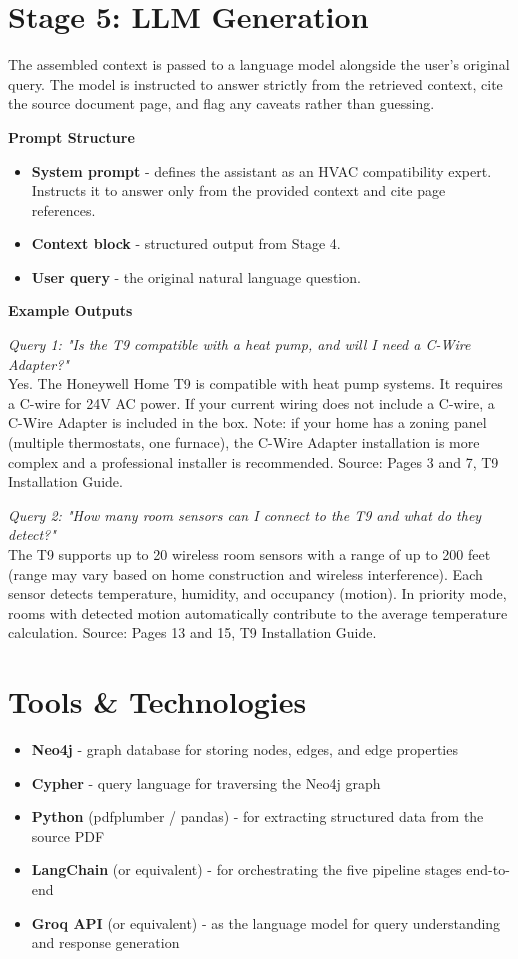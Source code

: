\documentclass[11pt,a4paper]{article}
\begin{document}
\section{Stage 5: LLM Generation}
The assembled context is passed to a language model alongside the user's original query. The model is instructed to answer strictly from the retrieved context, cite the source document page, and flag any caveats rather than guessing.

\textbf{Prompt Structure}
\begin{itemize}
    \item \textbf{System prompt} - defines the assistant as an HVAC compatibility expert. Instructs it to answer only from the provided context and cite page references.
    \item \textbf{Context block} - structured output from Stage 4.
    \item \textbf{User query} - the original natural language question.
\end{itemize}

\textbf{Example Outputs}

\textit{Query 1: "Is the T9 compatible with a heat pump, and will I need a C-Wire Adapter?"} \\
Yes. The Honeywell Home T9 is compatible with heat pump systems. It requires a C-wire for 24V AC power. If your current wiring does not include a C-wire, a C-Wire Adapter is included in the box. Note: if your home has a zoning panel (multiple thermostats, one furnace), the C-Wire Adapter installation is more complex and a professional installer is recommended. Source: Pages 3 and 7, T9 Installation Guide.

\textit{Query 2: "How many room sensors can I connect to the T9 and what do they detect?"} \\
The T9 supports up to 20 wireless room sensors with a range of up to 200 feet (range may vary based on home construction and wireless interference). Each sensor detects temperature, humidity, and occupancy (motion). In priority mode, rooms with detected motion automatically contribute to the average temperature calculation. Source: Pages 13 and 15, T9 Installation Guide.

\section{Tools \& Technologies}
\begin{itemize}
    \item \textbf{Neo4j} - graph database for storing nodes, edges, and edge properties
    \item \textbf{Cypher} - query language for traversing the Neo4j graph
    \item \textbf{Python} (pdfplumber / pandas) - for extracting structured data from the source PDF
    \item \textbf{LangChain} (or equivalent) - for orchestrating the five pipeline stages end-to-end
    \item \textbf{Groq API} (or equivalent) - as the language model for query understanding and response generation
\end{itemize}
\end{document}
